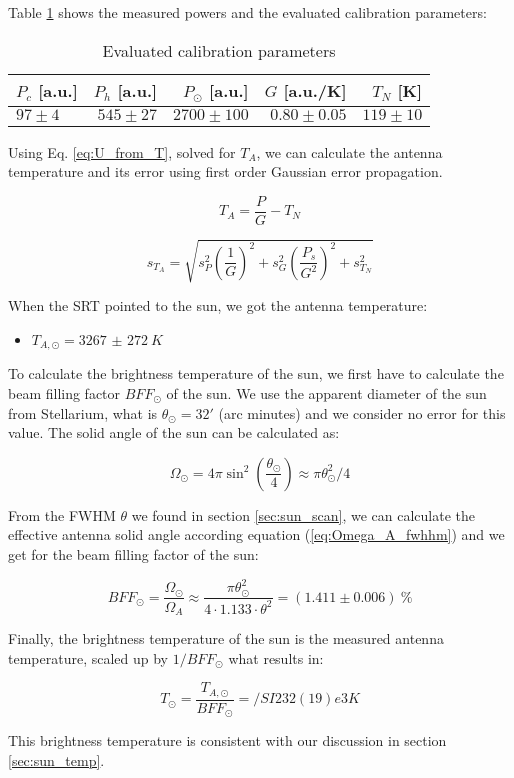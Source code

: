 Table \ref{tab:calib} shows the measured powers and the evaluated calibration parameters:

\begin{table}[H]
\centering
\begin{tabular}{l r  r  r  r }
    \toprule
    $P_c$ [a.u.] & $P_h$ [a.u.]  & $P_\odot$ [a.u.]  & $G$ [a.u./K]    & $T_N$ [K]\\
    \midrule
    $97 \pm 4$   & $545 \pm 27$  & $2700 \pm 100$    & $0.80 \pm 0.05$ & $119 \pm 10$ \\
    \bottomrule
\end{tabular}
\caption{Evaluated calibration parameters}
\label{tab:calib}
\end{table}

Using Eq. \eqref{eq:U_from_T}, solved for $T_A$, we can calculate the antenna temperature and its error using first order Gaussian error propagation.

\begin{equation}
	T_A = \frac{P}{G}-T_N
\end{equation}

\begin{equation}
	s_{T_A} = \sqrt{s_P^{2} \left(\frac{1}{G}\right)^{2} + s_{G}^{2} \left(\frac{P_{s}}{G^{2}}\right)^{2} + s_{T_N}^{2}}
\end{equation}

When the SRT pointed to the sun, we got the antenna temperature:
\begin{itemize}
	\item $T_{A,\odot} = \SI{3267(272)}{K}$
\end{itemize}


To calculate the brightness temperature of the sun, we first have to calculate the beam filling factor $BFF_\odot$ of the sun. We use the apparent diameter of the sun from Stellarium, what is $\theta_\odot=32'$ (arc minutes) and we consider no error for this value. The solid angle of the sun can be calculated as:

\begin{equation}
	\Omega_\odot = 4 \pi \sin^2(\frac{\theta_\odot}{4}) \approx \pi \theta_\odot^2/4
\end{equation}

From the FWHM $\theta$ we found in section \ref{sec:sun_scan}, we can calculate the effective antenna solid angle according equation (\ref{eq:Omega_A_fwhhm}) and we get for the beam filling factor of the sun:

\begin{equation}
	BFF_\odot = \frac{\Omega_\odot}{\Omega_A} \approx \frac{\pi \theta_\odot^2}{4 \cdot 1.133 \cdot \theta^2} = (1.411\pm0.006)\ \%
\end{equation}

Finally, the brightness temperature of the sun is the measured antenna temperature, scaled up by $1/BFF_\odot$ what results in:

\begin{equation}
	T_\odot = \frac{T_{A,\odot}}{BFF_\odot} = /SI{232(19)e3}{K}
\end{equation}

This brightness temperature is consistent with our discussion in section \ref{sec:sun_temp}.
